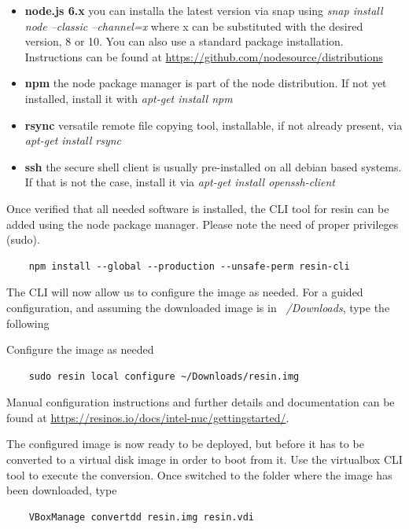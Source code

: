\documentclass[]{scrartcl}
\begin{document}
\begin{itemize}
	
	\item \textbf{node.js 6.x} you can installa the latest version via snap using \textit{snap install node --classic --channel=x} where x can be substituted with the desired version, 8 or 10. You can also use a standard package installation. Instructions can be found at \url{https://github.com/nodesource/distributions}
	\item \textbf{npm} the node package manager is part of the node distribution. If not yet installed, install it with \textit{apt-get install npm}
	\item \textbf{rsync} versatile remote file copying tool, installable, if not already present, via \textit{apt-get install rsync}
	\item \textbf{ssh} the secure shell client is usually pre-installed on all debian based systems. If that is not the case, install it via \textit{apt-get install openssh-client}
	
\end{itemize}

Once verified that all needed software is installed, the CLI tool for resin can be added using the node package manager. Please note the need of proper privileges (sudo).

\begin{verbatim}
	npm install --global --production --unsafe-perm resin-cli
\end{verbatim}

The CLI will now allow us to configure the image as needed. For a guided configuration, and assuming the downloaded image is in \textit{~/Downloads}, type the following 

Configure the image as needed
\begin{verbatim}
	sudo resin local configure ~/Downloads/resin.img
\end{verbatim}

Manual configuration instructions and further details and documentation can be found at \url{https://resinos.io/docs/intel-nuc/gettingstarted/}.

The configured image is now ready to be deployed, but before it has to be converted to a virtual disk image in order to boot from it. Use the virtualbox CLI tool to execute the conversion. Once switched to the folder where the image has been downloaded, type
\begin{verbatim}
	VBoxManage convertdd resin.img resin.vdi
\end{verbatim}
\end{document}
